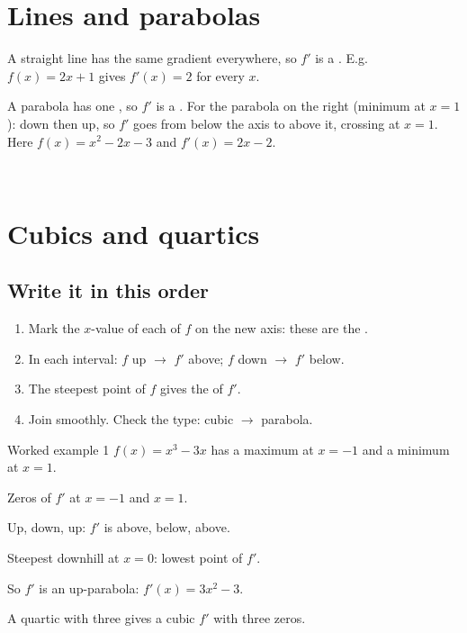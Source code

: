 \documentclass[11pt]{article}
\newlength\figunit
\begin{document}
\section{Lines and parabolas}\label{parab}
\begin{minipage}[t]{0.50\linewidth}
A straight line has the same gradient everywhere, so $f'$ is a .
E.g.\ $f(x)=2x+1$ gives $f'(x)=2$ for every $x$.

\smallskip
A parabola has one \tturn, so $f'$ is a .
For the parabola on the right (minimum at $x=1$): down then up, so $f'$ goes from below the axis to above it,
crossing at $x=1$. Here $f(x)=x^{2}-2x-3$ and $f'(x)=2x-2$.
\end{minipage}\hfill
\begin{minipage}[t]{0.46\linewidth}\centering\vspace{0pt}
\setlength\figunit{6.5mm}
\\[2mm]

\end{minipage}

\section{Cubics and quartics}\label{cubic}
\begin{minipage}[t]{0.50\linewidth}
\subsection{Write it in this order}
\begin{enumerate}[leftmargin=7mm, itemsep=1pt]
\item Mark the $x$-value of each \tturn of $f$ on the new axis: these are the .
\item In each interval: $f$ up $\to$ $f'$ above; $f$ down $\to$ $f'$ below.
\item The steepest point of $f$ gives the \tturn of $f'$.
\item Join smoothly. Check the type: cubic $\to$ parabola.
\end{enumerate}

\begin{example}{Worked example 1}
$f(x)=x^{3}-3x$ has a maximum at $x=-1$ and a minimum at $x=1$.
\begin{steps}
\item Zeros of $f'$ at $x=-1$ and $x=1$.
\item Up, down, up: $f'$ is above, below, above.
\item Steepest downhill at $x=0$: lowest point of $f'$.
\end{steps}
So $f'$ is an up-parabola: $f'(x)=3x^{2}-3$.
\end{example}
A quartic with three \tturns gives a cubic $f'$ with three zeros.
\end{minipage}\hfill
\begin{minipage}[t]{0.46\linewidth}\centering\vspace{2mm}
\setlength\figunit{7.2mm}
\\[2mm]

\end{minipage}
\end{document}
